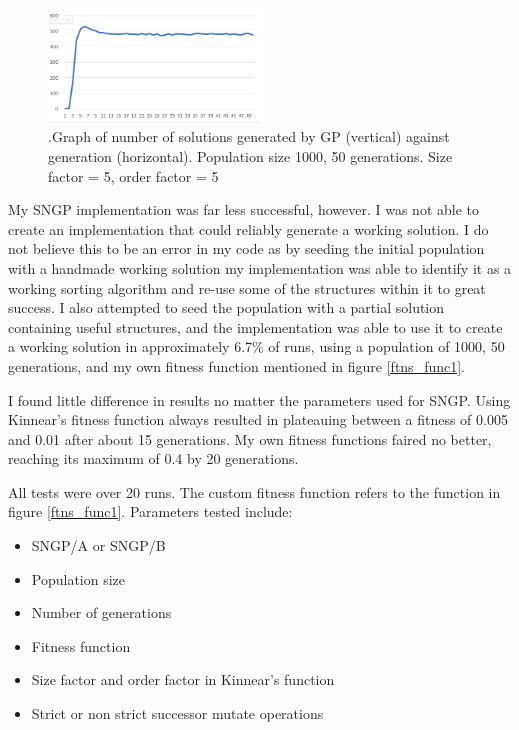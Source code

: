 \documentclass{article}
\begin{document}
        \begin{figure}[h]
        	\centering
        	\includegraphics[width=0.5\textwidth]{g_gp_success}
        	\caption{.Graph of number of solutions generated by GP (vertical) against generation (horizontal). Population size 1000, 50 generations. Size factor = 5, order factor = 5}
        	\label{g:gp_success}
        \end{figure}
    
    	My SNGP implementation was far less successful, however. I was not able to create an implementation that could reliably generate a working solution. I do not believe this to be an error in my code as by seeding the initial population with a handmade working solution my implementation was able to identify it as a working sorting algorithm and re-use some of the structures within it to great success. I also attempted to seed the population with a partial solution containing useful structures, and the implementation was able to use it to create a working solution in approximately 6.7\% of runs, using a population of 1000, 50 generations, and my own fitness function mentioned in figure \ref{ftns_func1}.
    	
    	I found little difference in results no matter the parameters used for SNGP. Using Kinnear's fitness function always resulted in plateauing between a fitness of 0.005 and 0.01 after about 15 generations. My own fitness functions faired no better, reaching its maximum of 0.4 by 20 generations.
    	
    	All tests were over 20 runs. The custom fitness function refers to the function in figure \ref{ftns_func1}. Parameters tested include:
    	
    	\begin{itemize}
    		\item SNGP/A or SNGP/B
    		\item Population size
    		\item Number of generations
    		\item Fitness function
    		\item Size factor and order factor in Kinnear's function
    		\item Strict or non strict successor mutate operations
    	\end{itemize}
    	
\end{document}
